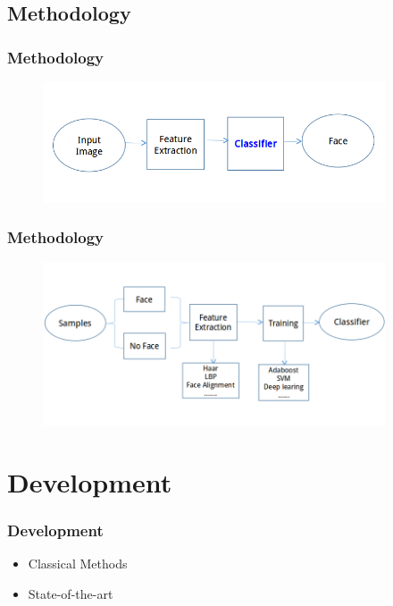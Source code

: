\documentclass[10pt]{beamer}
\begin{document}
\subsection{Methodology}
\begin{frame}
    \frametitle{Methodology}
   \begin{figure}[!ht]
   \centering
   \includegraphics[width=4.0in]{process.png}
   \end{figure}
\end{frame}

\begin{frame}
    \frametitle{Methodology}
   \begin{figure}[!ht]
   \centering
   \includegraphics[width=4.0in]{training.png}
   \end{figure}
\end{frame}



\section{Development}

\begin{frame}
    \frametitle{Development}
   \begin{itemize}
   \item Classical Methods
   \item State-of-the-art
   \end{itemize}
\end{frame}
\end{document}
